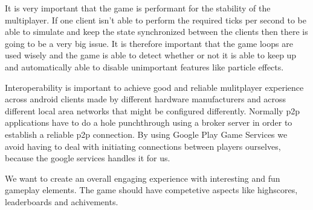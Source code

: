 	It is very important that the game is performant for the stability of the multiplayer. If one client isn't able to perform the required ticks per second to be able to simulate	and keep the state synchronized between the clients then there is going to be a very big issue. It is therefore important that the game loops are used wisely and the game is able to detect whether or not it is able to keep up and automatically able to disable unimportant features like particle effects.

	Interoperability is important to achieve good and reliable mulitplayer experience across android clients made by different hardware manufacturers and across different local area networks that might be configured differently. Normally p2p applications have to do a hole punchthrough using a broker server in order to establish a reliable p2p connection. By using Google Play Game Services we avoid having to deal with initiating connections between players ourselves, because the google services handles it for us.

	We want to create an overall engaging experience with interesting and fun gameplay elements. The game should have competetive aspects	like highscores, leaderboards and achivements.
